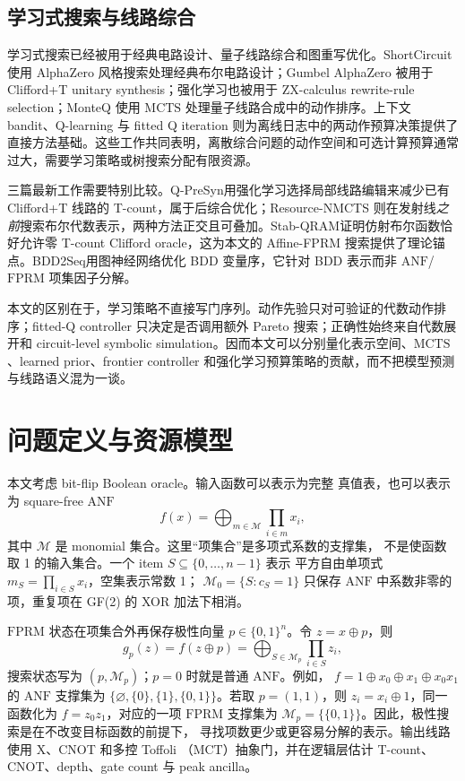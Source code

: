 \documentclass[UTF8,fontset=fandol,11pt]{ctexart}
\newcommand{\method}{Resource-NMCTS}
\newcommand{\anf}{\ensuremath{\mathrm{ANF}}}
\newcommand{\fprm}{\ensuremath{\mathrm{FPRM}}}
\newcommand{\mcts}{\ensuremath{\mathrm{MCTS}}}
\newcommand{\xor}{\ensuremath{\oplus}}
\newcommand{\mct}{\ensuremath{\mathrm{MCT}}}
\newcommand{\ttable}{真值表}
\begin{document}
\subsection{学习式搜索与线路综合}

学习式搜索已经被用于经典电路设计、量子线路综合和图重写优化。ShortCircuit 使用 AlphaZero 风格搜索处理经典布尔电路设计\cite{tsaras2024shortcircuit}；Gumbel AlphaZero 被用于 Clifford+T unitary synthesis\cite{rietsch2024unitary}；强化学习也被用于 ZX-calculus rewrite-rule selection\cite{riu2025rlzx}；MonteQ 使用 \mcts{} 处理量子线路合成中的动作排序\cite{machiya2026monteq}。上下文 bandit、Q-learning 与 fitted Q iteration 则为离线日志中的两动作预算决策提供了直接方法基础\cite{li2010contextual,watkins1992qlearning,ernst2005fittedq}。这些工作共同表明，离散综合问题的动作空间和可选计算预算通常过大，需要学习策略或树搜索分配有限资源。

三篇最新工作需要特别比较。Q-PreSyn\cite{qpresyn2026}用强化学习选择局部线路编辑来减少已有 Clifford+T 线路的 T-count，属于后综合优化；\method{} 则在发射线\emph{之前}搜索布尔代数表示，两种方法正交且可叠加。Stab-QRAM\cite{stabqram2025}证明仿射布尔函数恰好允许零 T-count Clifford oracle，这为本文的 Affine-FPRM 搜索提供了理论锚点。BDD2Seq\cite{bdd2seq2025}用图神经网络优化 BDD 变量序，它针对 BDD 表示而非 \anf{}/\fprm{} 项集因子分解。

本文的区别在于，学习策略不直接写门序列。动作先验只对可验证的代数动作排序；fitted-Q controller 只决定是否调用额外 Pareto 搜索；正确性始终来自代数展开和 circuit-level symbolic simulation。因而本文可以分别量化表示空间、\mcts{}、learned prior、frontier controller 和强化学习预算策略的贡献，而不把模型预测与线路语义混为一谈。

\section{问题定义与资源模型}

本文考虑 bit-flip Boolean oracle。输入函数可以表示为完整 \ttable{}，也可以表示为 square-free \anf{}
\begin{equation}
  f(x)=\bigoplus_{m\in\mathcal{M}}\prod_{i\in m}x_i ,
  \label{eq:anf}
\end{equation}
其中 $\mathcal{M}$ 是 monomial 集合。这里“项集合”是多项式系数的支撑集，
不是使函数取 1 的输入集合。一个 item $S\subseteq\{0,\ldots,n-1\}$ 表示
平方自由单项式 $m_S=\prod_{i\in S}x_i$，空集表示常数 1；
$\mathcal{M}_0=\{S:c_S=1\}$ 只保存 \anf{} 中系数非零的项，重复项在 GF(2)
的 XOR 加法下相消。

\fprm{} 状态在项集合外再保存极性向量 $p\in\{0,1\}^n$。令
$z=x\xor p$，则
\begin{equation}
g_p(z)=f(z\xor p)=\bigoplus_{S\in\mathcal{M}_p}\prod_{i\in S}z_i,
\label{eq:fprm-support-zh}
\end{equation}
搜索状态写为 $(p,\mathcal{M}_p)$；$p=0$ 时就是普通 \anf{}。例如，
$f=1\xor x_0\xor x_1\xor x_0x_1$ 的 \anf{} 支撑集为
$\{\varnothing,\{0\},\{1\},\{0,1\}\}$。若取 $p=(1,1)$，则
$z_i=x_i\xor1$，同一函数化为 $f=z_0z_1$，对应的一项 \fprm{} 支撑集为
$\mathcal{M}_p=\{\{0,1\}\}$。因此，极性搜索是在不改变目标函数的前提下，
寻找项数更少或更容易分解的表示。输出线路使用 X、CNOT 和多控 Toffoli
（\mct{}）抽象门，并在逻辑层估计 T-count、CNOT、depth、gate count 与
peak ancilla。
\end{document}
